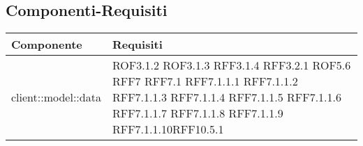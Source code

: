 \subsection{Componenti-Requisiti} %
\label{sub:componenti_requisiti}
\begin{center}
\def\arraystretch{1.5}
\bgroup
\begin{longtable}{| p{9cm} | p{4cm} |}
\hline
\textbf{Componente} & \textbf{Requisiti} \\
\hline
client::model::data  &  ROF3.1.2 \newline ROF3.1.3 \newline RFF3.1.4 \newline RFF3.2.1 \newline ROF5.6 \newline RFF7 \newline RFF7.1 \newline RFF7.1.1.1 \newline RFF7.1.1.2 \newline RFF7.1.1.3 \newline RFF7.1.1.4 \newline RFF7.1.1.5 \newline RFF7.1.1.6 \newline RFF7.1.1.7 \newline RFF7.1.1.8 \newline RFF7.1.1.9 \newline RFF7.1.1.10\newline RFF10.5.1 \\
\hline

\end{longtable}
\end{center}
